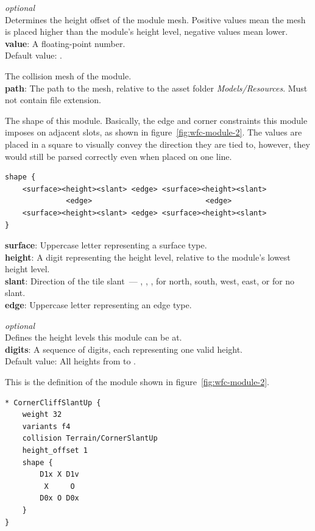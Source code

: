 \emph{optional}\\
Determines the height offset of the module mesh.
Positive values mean the mesh is placed higher than the module's height level, negative values mean lower.\\
\textbf{value}: A floating-point number.\\
Default value: .

The collision mesh of the module.\\
\textbf{path}: The path to the mesh, relative to the asset folder \emph{Models/Resources}. Must not contain file extension.

The shape of this module.
Basically, the edge and corner constraints this module imposes on adjacent slots, as shown in figure~\ref{fig:wfc-module-2}.
The values are placed in a square to visually convey the direction they are tied to, however, they would still be parsed correctly even when placed on one line.
\begin{verbatim}
shape {
    <surface><height><slant> <edge> <surface><height><slant>
              <edge>                          <edge>
    <surface><height><slant> <edge> <surface><height><slant>
}
\end{verbatim}
\textbf{surface}: Uppercase letter representing a surface type.\\
\textbf{height}: A digit representing the height level, relative to the module's lowest height level.\\
\textbf{slant}: Direction of the tile slant~--- \mono{\^}, , \mono{<}, \mono{>} for north, south, west, east, or  for no slant.\\
\textbf{edge}: Uppercase letter representing an edge type.

\emph{optional}\\
Defines the height levels this module can be at.\\
\textbf{digits}: A sequence of digits, each representing one valid height.\\
Default value: All heights from  to .

This is the definition of the module shown in figure~\ref{fig:wfc-module-2}.
\begin{verbatim}
* CornerCliffSlantUp {
    weight 32
    variants f4
    collision Terrain/CornerSlantUp
    height_offset 1
    shape {
        D1x X D1v
         X     O
        D0x O D0x
    }
}
\end{verbatim}

